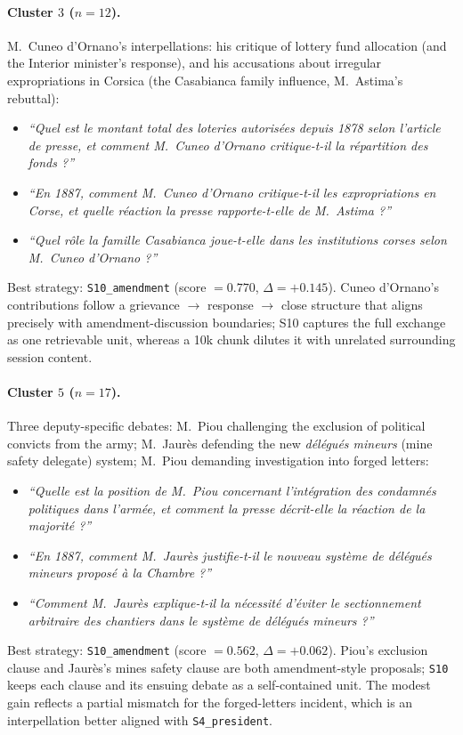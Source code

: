 \paragraph{Cluster $3$ ($n=12$).}
M.~Cuneo d'Ornano's interpellations: his critique of lottery fund allocation (and
the Interior minister's response), and his accusations about irregular
expropriations in Corsica (the Casabianca family influence, M.~Astima's rebuttal):
\begin{itemize}
  \item \textit{``Quel est le montant total des loteries autoris\'{e}es depuis 1878
    selon l'article de presse, et comment M.~Cuneo d'Ornano critique-t-il la
    r\'{e}partition des fonds ?''}
  \item \textit{``En 1887, comment M.~Cuneo d'Ornano critique-t-il les
    expropriations en Corse, et quelle r\'{e}action la presse rapporte-t-elle de
    M.~Astima ?''}
  \item \textit{``Quel r\^{o}le la famille Casabianca joue-t-elle dans les
    institutions corses selon M.~Cuneo d'Ornano ?''}
\end{itemize}
Best strategy: \texttt{S10\_amendment} (score $= 0.770$, $\Delta = +0.145$).
Cuneo d'Ornano's contributions follow a grievance $\to$ response $\to$ close
structure that aligns precisely with amendment-discussion boundaries; S10
captures the full exchange as one retrievable unit, whereas a 10k chunk dilutes
it with unrelated surrounding session content.

\paragraph{Cluster $5$ ($n=17$).}
Three deputy-specific debates: M.~Piou challenging the exclusion of political
convicts from the army; M.~Jaur\`{e}s defending the new \emph{d\'{e}l\'{e}gu\'{e}s
mineurs} (mine safety delegate) system; M.~Piou demanding investigation into
forged letters:
\begin{itemize}
  \item \textit{``Quelle est la position de M.~Piou concernant l'int\'{e}gration
    des condamn\'{e}s politiques dans l'arm\'{e}e, et comment la presse
    d\'{e}crit-elle la r\'{e}action de la majorit\'{e} ?''}
  \item \textit{``En 1887, comment M.~Jaur\`{e}s justifie-t-il le nouveau
    syst\`{e}me de d\'{e}l\'{e}gu\'{e}s mineurs propos\'{e} \`{a} la Chambre ?''}
  \item \textit{``Comment M.~Jaur\`{e}s explique-t-il la n\'{e}cessit\'{e}
    d'\'{e}viter le sectionnement arbitraire des chantiers dans le syst\`{e}me de
    d\'{e}l\'{e}gu\'{e}s mineurs ?''}
\end{itemize}
Best strategy: \texttt{S10\_amendment} (score $= 0.562$, $\Delta = +0.062$).
Piou's exclusion clause and Jaur\`{e}s's mines safety clause are both
amendment-style proposals; \texttt{S10} keeps each clause and its ensuing debate
as a self-contained unit.
The modest gain reflects a partial mismatch for the forged-letters incident, which
is an interpellation better aligned with \texttt{S4\_president}.

